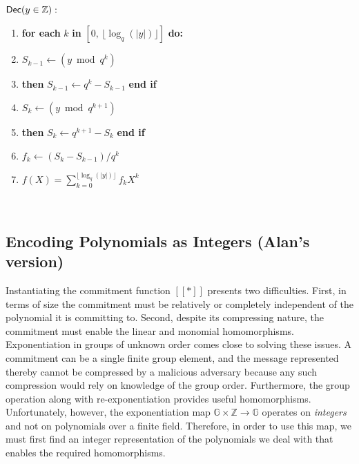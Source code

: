  \begin{minipage}{\textwidth}
\begin{mdframed}
\begin{flushleft}
	$\textsf{{Dec}}(y \in \mathbb{Z}):$
	\begin{enumerate}[nolistsep]
	    \item \textbf{for each} $k$ \textbf{in} $[0, \, \lfloor \log_q(|y|)\rfloor]$ \textbf{do:}\\
		\item \pcind[1] $S_{k-1} \gets (y \bmod q^{k})$
		\item \pcind[1]  \textbf{then} $S_{k-1} \gets q^{k}-S_{k-1}$ \textbf{end if}
		\item \pcind[1] $S_k \gets (y \bmod q^{k+1})$
		\item \pcind[1]  \textbf{then} $S_{k} \gets q^{k+1}-S_{k}$ \textbf{end if}
		\item \pcind[1] $f_k \gets (S_{k} - S_{k-1}) / q^k$
		\item \pcreturn $f(X) = \sum_{k=0}^{\lfloor \log_q(|y|)\rfloor} f_k X^k$
	\end{enumerate} 
\end{flushleft}
\end{mdframed}
\end{minipage} \\ 


\subsection{Encoding Polynomials as Integers (Alan's version)}
\label{sec:encoding}

Instantiating the commitment function $[\![*]\!]$ presents two difficulties. First, in terms of size the commitment must be relatively or completely independent of the polynomial it is committing to. Second, despite its compressing nature, the commitment must enable the linear and monomial homomorphisms. Exponentiation in groups of unknown order comes close to solving these issues. A commitment can be a single finite group element, and the message represented thereby cannot be compressed by a malicious adversary because any such compression would rely on knowledge of the group order. Furthermore, the group operation along with re-exponentiation provides useful homomorphisms. Unfortunately, however, the exponentiation map $\mathbb{G} \times \mathbb{Z} \rightarrow \mathbb{G}$ operates on \emph{integers} and not on polynomials over a finite field. Therefore, in order to use this map, we must first find an integer representation of the polynomials we deal with that enables the required homomorphisms.

